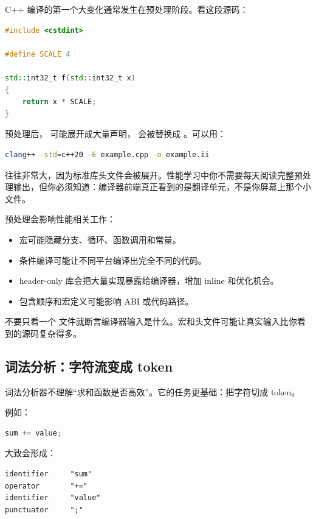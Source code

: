 C++ 编译的第一个大变化通常发生在预处理阶段。看这段源码：

\begin{lstlisting}[language=C++]
#include <cstdint>

#define SCALE 4

std::int32_t f(std::int32_t x)
{
    return x * SCALE;
}
\end{lstlisting}

预处理后， 可能展开成大量声明， 会被替换成 。可以用：

\begin{lstlisting}[language=bash]
clang++ -std=c++20 -E example.cpp -o example.ii
\end{lstlisting}

 往往非常大，因为标准库头文件会被展开。性能学习中你不需要每天阅读完整预处理输出，但你必须知道：编译器前端真正看到的是翻译单元，不是你屏幕上那个小文件。

预处理会影响性能相关工作：

\begin{itemize}
  \item 宏可能隐藏分支、循环、函数调用和常量。
  \item 条件编译可能让不同平台编译出完全不同的代码。
  \item header-only 库会把大量实现暴露给编译器，增加 inline 和优化机会。
  \item 包含顺序和宏定义可能影响 ABI 或代码路径。
\end{itemize}

\begin{warningbox}
不要只看一个  文件就断言编译器输入是什么。宏和头文件可能让真实输入比你看到的源码复杂得多。
\end{warningbox}

\subsection{词法分析：字符流变成 token}

词法分析器不理解“求和函数是否高效”。它的任务更基础：把字符切成 token。

例如：

\begin{lstlisting}[language=C++]
sum += value;
\end{lstlisting}

大致会形成：

\begin{lstlisting}
identifier     "sum"
operator       "+="
identifier     "value"
punctuator     ";"
\end{lstlisting}

